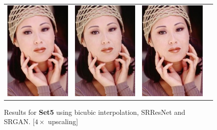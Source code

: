 \documentclass[10pt,twocolumn,letterpaper]{article}
\begin{document}
\begin{figure}[h!]
\begin{tabular}{cccc}
\includegraphics[width=1.4in]{images/used/appendix/jpg/Set5/woman_SRResNet-MSE} &
\includegraphics[width=1.4in]{images/used/appendix/jpg/Set5/woman_SRGAN-VGG54} &
\includegraphics[width=1.4in]{images/used/appendix/jpg/Set5/woman_HR} \\
\end{tabular}
\label{fig:app_Set5}
\caption{Results for \textbf{Set5} using bicubic interpolation, SRResNet and SRGAN. [$4\times$ upscaling]}
\end{figure}

\clearpage
\end{document}
